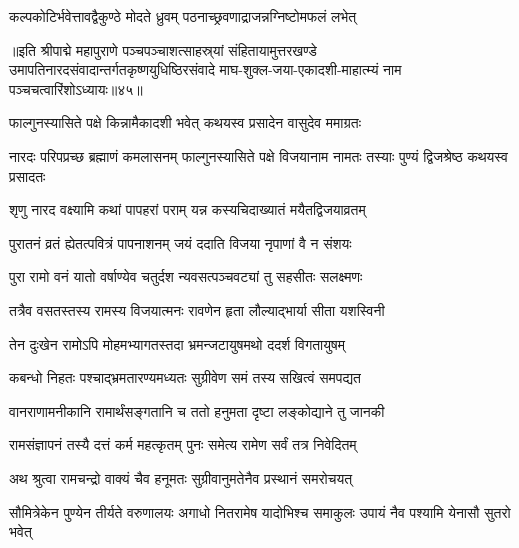 \twolineshloka
{कल्पकोटिर्भवेत्तावद्वैकुण्ठे मोदते ध्रुवम्}
{पठनाच्छ्रवणाद्राजन्नग्निष्टोमफलं लभेत्}%

॥इति श्रीपाद्मे महापुराणे पञ्चपञ्चाशत्साहस्र्यां संहितायामुत्तरखण्डे उमापतिनारदसंवादान्तर्गतकृष्णयुधिष्ठिरसंवादे माघ-शुक्ल-जया-एकादशी-माहात्म्यं नाम पञ्चचत्वारिंशोऽध्यायः॥४५॥


\hyperref[sec:ekadashi_mahatmyam_padma_puranam]{\closesub}
\clearpage

\label{sec:padma-phalguna-krishna-vijaya}



\twolineshloka
{फाल्गुनस्यासिते पक्षे किन्नामैकादशी भवेत्}
{कथयस्व प्रसादेन वासुदेव ममाग्रतः}%


\threelineshloka
{नारदः परिपप्रच्छ ब्रह्माणं कमलासनम्}
{फाल्गुनस्यासिते पक्षे विजयानाम नामतः}
{तस्याः पुण्यं द्विजश्रेष्ठ कथयस्व प्रसादतः}%


\twolineshloka
{शृणु नारद वक्ष्यामि कथां पापहरां पराम्}
{यन्न कस्यचिदाख्यातं मयैतद्विजयाव्रतम्}%

\twolineshloka
{पुरातनं व्रतं ह्येतत्पवित्रं पापनाशनम्}
{जयं ददाति विजया नृपाणां वै न संशयः}%

\twolineshloka
{पुरा रामो वनं यातो वर्षाण्येव चतुर्दश}
{न्यवसत्पञ्चवट्यां तु  सहसीतः सलक्ष्मणः}%

\twolineshloka
{तत्रैव वसतस्तस्य रामस्य विजयात्मनः}
{रावणेन हृता लौल्याद्भार्या सीता यशस्विनी}%

\twolineshloka
{तेन दुःखेन रामोऽपि मोहमभ्यागतस्तदा}
{भ्रमन्जटायुषमथो ददर्श विगतायुषम्}%

\twolineshloka
{कबन्धो निहतः पश्चाद्भ्रमतारण्यमध्यतः}
{सुग्रीवेण समं तस्य सखित्वं समपद्यत}%

\twolineshloka
{वानराणामनीकानि रामार्थंसङ्गतानि च}
{ततो हनुमता दृष्टा लङ्कोद्याने तु जानकी}%

\twolineshloka
{रामसंज्ञापनं तस्यै दत्तं कर्म महत्कृतम्}
{पुनः समेत्य रामेण सर्वं तत्र निवेदितम्}%

\twolineshloka
{अथ श्रुत्वा रामचन्द्रो वाक्यं चैव हनूमतः}
{सुग्रीवानुमतेनैव प्रस्थानं समरोचयत्}%

\threelineshloka
{सौमित्रेकेन पुण्येन तीर्यते वरुणालयः}
{अगाधो नितरामेष यादोभिश्च समाकुलः}
{उपायं नैव पश्यामि येनासौ सुतरो भवेत्}%


